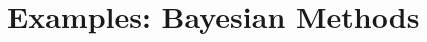 \documentclass[thesis.tex]{subfiles}
\newcommand{\p}[1]{p\left({#1}\right)}
\begin{document}
%
%
%
%
%


\section{Examples: Bayesian Methods}

\end{document}
